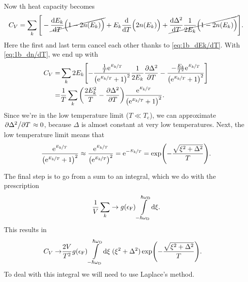 \documentclass[11pt,letter, swedish, english
]{article}
\newcommand{\Tc}{\ensuremath{T_{\text{c}}}}
\newcommand{\eF}{\ensuremath{\epsilon_{\text{F}}}}
\newcommand{\wD}{\ensuremath{\omega_{\text{D}}}}
\begin{document}
Now th heat capacity becomes
\begin{equation}
C_V=\sum_k\Bigg[
-\cancel{\dv{E_k}{T}\Big(1-2n(E_k)\Big)}
+E_k\dv{T}\Big(2n(E_k)\Big)
+\cancel{\dv{\Delta^2}{T}\frac{1}{2E_k}\Big(1-2n(E_k)\Big)}
\Bigg].
\end{equation}
Here the first and last term cancel each other thanks to
\eqref{eq:1b_dEk/dT}. With \eqref{eq:1b_dn/dT}, we end up with
\begin{equation}\label{eq:1b_Cv_exact}
\begin{aligned}
C_V=&\sum_k2E_k\qty[
-\frac{\frac{1}{T}\mathrm{e}^{\nicefrac{E_k}{T}}}
{\qty(\mathrm{e}^{\nicefrac{E_k}{T}}+1)^2} \frac{1}{2E_k}\pdv{\Delta^2}{T}
-\frac{-\frac{E_k}{T^2}\mathrm{e}^{\nicefrac{E_k}{T}}}
{\qty(\mathrm{e}^{\nicefrac{E_k}{T}}+1)^2} ]\\
=&\frac{1}{T}\sum_k\qty(\frac{2E_k^2}{T}-\pdv{\Delta^2}{T})
\frac{\mathrm{e}^{\nicefrac{E_k}{T}}}{\qty(\mathrm{e}^{\nicefrac{E_k}{T}}+1)^2}.
\end{aligned}
\end{equation}
Since we're in the low temperature limit ($T\ll\Tc$), we can
approximate $\pdv*{\Delta^2}{T}\approx0$, 
because ${\Delta}$ is almost constant at very low temperatures. Next,
the low temperature limit means that
\begin{equation}
\frac{\mathrm{e}^{\nicefrac{E_k}{T}}}{\qty(\mathrm{e}^{\nicefrac{E_k}{T}}+1)^2}
\approx
\frac{\mathrm{e}^{\nicefrac{E_k}{T}}}{\qty(\mathrm{e}^{\nicefrac{E_k}{T}})^2}
=\mathrm{e}^{-\nicefrac{E_k}{T}}
=\exp(-\frac{\sqrt{\xi^2+\Delta^2}}{T}).
\end{equation}

The final step is to go from a sum to an integral, which we do with
the prescription
\begin{equation}\label{eq:1_sum_int}
\frac{1}{V}\sum_k \to g(\eF)\int_{-\hbar\wD}^{\hbar\wD}\!\rd\xi.
\end{equation}
This results in
\begin{equation}
\begin{aligned}
C_V\to&\frac{2V}{T^2}g(\eF)\int_{-\hbar\wD}^{\hbar\wD}\!\rd\xi\;
(\xi^2+\Delta^2)\exp(-\frac{\sqrt{\xi^2+\Delta^2}}{T}).
\end{aligned}
\end{equation}
To deal with this integral we will need to use Laplace's method.
\end{document}
